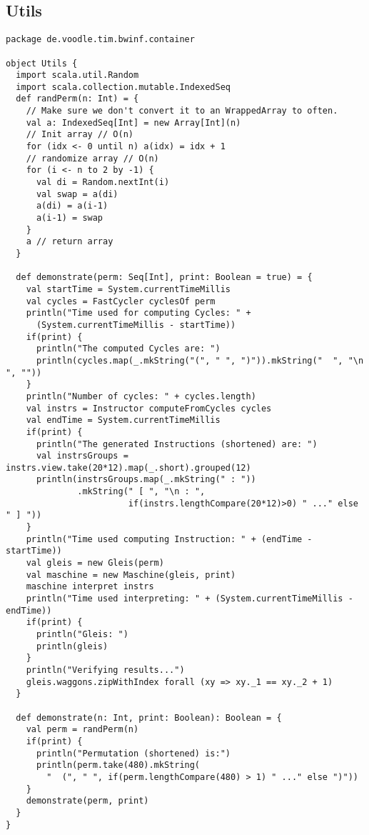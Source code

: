 \subsection{Utils}
\begin{lstlisting}
package de.voodle.tim.bwinf.container

object Utils {
  import scala.util.Random
  import scala.collection.mutable.IndexedSeq
  def randPerm(n: Int) = {
    // Make sure we don't convert it to an WrappedArray to often.
    val a: IndexedSeq[Int] = new Array[Int](n)
    // Init array // O(n)
    for (idx <- 0 until n) a(idx) = idx + 1
    // randomize array // O(n)
    for (i <- n to 2 by -1) {
      val di = Random.nextInt(i)
      val swap = a(di)
      a(di) = a(i-1)
      a(i-1) = swap
    }
    a // return array
  }

  def demonstrate(perm: Seq[Int], print: Boolean = true) = {
    val startTime = System.currentTimeMillis
    val cycles = FastCycler cyclesOf perm
    println("Time used for computing Cycles: " +
      (System.currentTimeMillis - startTime))
    if(print) {
      println("The computed Cycles are: ")
      println(cycles.map(_.mkString("(", " ", ")")).mkString("  ", "\n  ", ""))
    }
    println("Number of cycles: " + cycles.length)
    val instrs = Instructor computeFromCycles cycles
    val endTime = System.currentTimeMillis
    if(print) {
      println("The generated Instructions (shortened) are: ")
      val instrsGroups = instrs.view.take(20*12).map(_.short).grouped(12)
      println(instrsGroups.map(_.mkString(" : "))
              .mkString(" [ ", "\n : ",
                        if(instrs.lengthCompare(20*12)>0) " ..." else " ] "))
    }
    println("Time used computing Instruction: " + (endTime - startTime))
    val gleis = new Gleis(perm)
    val maschine = new Maschine(gleis, print)
    maschine interpret instrs
    println("Time used interpreting: " + (System.currentTimeMillis - endTime))
    if(print) {
      println("Gleis: ")
      println(gleis)
    }
    println("Verifying results...")
    gleis.waggons.zipWithIndex forall (xy => xy._1 == xy._2 + 1)
  }

  def demonstrate(n: Int, print: Boolean): Boolean = {
    val perm = randPerm(n)
    if(print) {
      println("Permutation (shortened) is:")
      println(perm.take(480).mkString(
        "  (", " ", if(perm.lengthCompare(480) > 1) " ..." else ")"))
    }
    demonstrate(perm, print)
  }
}
\end{lstlisting}
\clearpage
\addtolength{\footskip}{-1.8cm}
